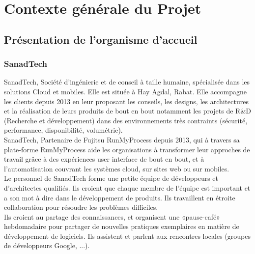 
\chapter{Contexte générale du Projet} %

\label{Chapitre 1} %



\section{Présentation de l’organisme d’accueil}

\subsection{SanadTech}
SanadTech, Société d'ingénierie et de conseil à taille humaine, spécialisée dans les solutions Cloud et mobiles. Elle est située à Hay Agdal, Rabat. Elle accompagne les clients depuis 2013 en leur proposant les conseils, les designs, les architectures et la réalisation de leurs produits de bout en bout notamment les projets de R\&D (Recherche et développement) dans des environnements très contraints (sécurité, performance, disponibilité, volumétrie).\\[0.5cm]
SanadTech, Partenaire de Fujitsu RunMyProcess depuis 2013, qui à travers sa plate-forme RunMyProcess aide les organisations à transformer leur approches de travail grâce à des expériences user interface de bout en bout, et à l'automatisation couvrant les systèmes cloud, sur sites web ou sur mobiles.\\[0.5cm]
Le personnel de SanadTech forme une petite équipe de développeurs et d'architectes qualifiés. Ils croient que chaque membre de l'équipe est important et a son mot à dire dans le développement de produits. Ils travaillent en étroite collaboration pour résoudre les problèmes difficiles.\\[0.5cm]
Ils croient au partage des connaissances, et organisent une «pause-café» hebdomadaire pour partager de nouvelles pratiques exemplaires en matière de développement de logiciels. Ils assistent et parlent aux rencontres locales (groupes de développeurs Google, ...).
